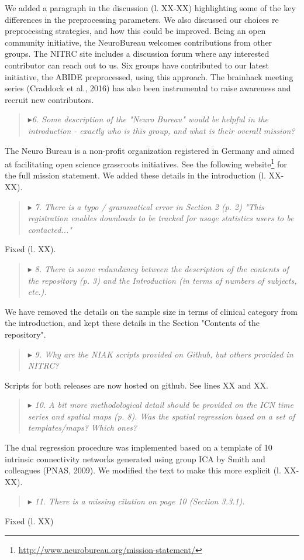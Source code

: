 \documentclass[authoryear,3p]{elsarticle}
\begin{document}
We added a paragraph in the discussion (l. XX-XX) highlighting some of the key differences in the preprocessing parameters. We also discussed our choices re preprocessing strategies, and how this could be improved. Being an open community initiative, the NeuroBureau welcomes contributions from other groups. The NITRC site includes a discussion forum where any interested contributor can reach out to us. Six groups have contributed to our latest initiative, the ABIDE preprocessed, using this approach. The brainhack meeting series (Craddock et al., 2016) has also been instrumental to raise awareness and recruit new contributors. 

\begin{quote}
$\blacktriangleright$\emph{6. Some description of the "Neuro Bureau" would be helpful in the introduction - exactly who is this group, and what is their overall mission?
}
\end{quote}

The Neuro Bureau is a non-profit organization registered in Germany and aimed at facilitating open science grassroots initiatives. See the following website\footnote{\url{http://www.neurobureau.org/mission-statement/}} for the full mission statement. We added these details in the introduction (l. XX-XX).  

\begin{quote}
$\blacktriangleright$\emph{ 7. There is a typo / grammatical error in Section 2 (p. 2) "This registration enables downloads to be tracked for usage statistics users to be contacted..."
}
\end{quote}
Fixed (l. XX). 


\begin{quote}
$\blacktriangleright$\emph{ 
8. There is some redundancy between the description of the contents of the repository (p. 3) and the Introduction (in terms of numbers of subjects, etc.).
}
\end{quote}
We have removed the details on the sample size in terms of clinical category from the introduction, and kept these details in the Section "Contents of the repository". 

\begin{quote}
$\blacktriangleright$\emph{ 
9. Why are the NIAK scripts provided on Github, but others provided in NITRC?}
\end{quote}
Scripts for both releases are now hosted on github. See lines XX and XX. 

\begin{quote}
$\blacktriangleright$\emph{ 
10. A bit more methodological detail should be provided on the ICN time series and spatial maps (p. 8).  Was the spatial regression based on a set of templates/maps?  Which ones?}
\end{quote}
The dual regression procedure was implemented based on a template of 10 intrinsic connectivity networks generated using group ICA by Smith and colleagues (PNAS, 2009). We modified the text to make this more explicit (l. XX-XX). 

\begin{quote}
$\blacktriangleright$\emph{ 
11. There is a missing citation on page 10 (Section 3.3.1).
}
\end{quote}

Fixed (l. XX)
\end{document}

